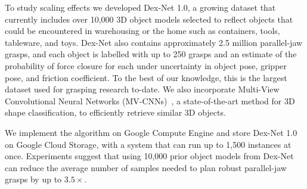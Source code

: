 To study scaling effects we developed Dex-Net 1.0, a growing dataset that currently includes over 10,000 3D object models selected to reflect objects that could be encountered in warehousing or the home such as containers, tools, tableware, and toys.
Dex-Net also contains approximately 2.5 million parallel-jaw grasps, and each object is labelled with up to 250 grasps and an estimate of the probability of force closure for each under uncertainty in object pose, gripper pose, and friction coefficient.
To the best of our knowledge, this is the largest dataset used for grasping research to-date.
We also incorporate Multi-View Convolutional Neural Networks (MV-CNNs)~\cite{su2015multi}, a state-of-the-art method for 3D shape classification, to efficiently retrieve similar 3D objects. 

We implement the algorithm on Google Compute Engine and store Dex-Net 1.0 on Google Cloud Storage, with a system that can run up to 1,500 instances at once.
Experiments suggest that using 10,000 prior object models from Dex-Net can reduce the average number of samples needed to plan robust parallel-jaw grasps by up to $3.5\times$.

 





